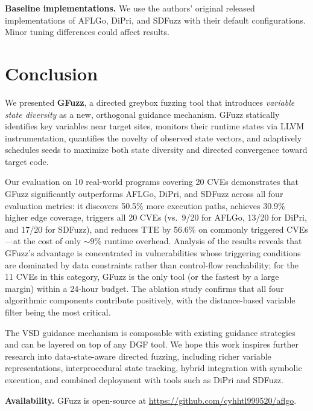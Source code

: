 \documentclass[preprint,12pt,3p]{elsarticle}
\begin{document}
\textbf{Baseline implementations.}  We use the authors' original released
implementations of AFLGo, DiPri, and SDFuzz with their default
configurations.  Minor tuning differences could affect results.

\section{Conclusion}
\label{sec:conclusion}

We presented \textbf{GFuzz}, a directed greybox fuzzing tool that introduces
\emph{variable state diversity} as a new, orthogonal guidance mechanism.
GFuzz statically identifies key variables near target sites, monitors their
runtime states via LLVM instrumentation, quantifies the novelty of observed
state vectors, and adaptively schedules seeds to maximize both state diversity
and directed convergence toward target code.

Our evaluation on 10 real-world programs covering 20 CVEs demonstrates that
GFuzz significantly outperforms AFLGo, DiPri, and SDFuzz across all four
evaluation metrics: it discovers 50.5\% more execution paths, achieves
30.9\% higher edge coverage, triggers all 20 CVEs (vs.\ 9/20 for AFLGo,
13/20 for DiPri, and 17/20 for SDFuzz), and reduces TTE by 56.6\% on
commonly triggered CVEs---at the cost of only $\sim$9\% runtime overhead.
Analysis of the results reveals that GFuzz's advantage is concentrated in
vulnerabilities whose triggering conditions are dominated by data constraints
rather than control-flow reachability; for the 11 CVEs in this category,
GFuzz is the only tool (or the fastest by a large margin) within a 24-hour
budget.  The ablation study confirms that all four algorithmic components
contribute positively, with the distance-based variable filter being the most
critical.

The VSD guidance mechanism is composable with existing guidance strategies
and can be layered on top of any DGF tool.  We hope this work inspires
further research into data-state-aware directed fuzzing, including richer
variable representations, interprocedural state tracking, hybrid integration
with symbolic execution, and combined deployment with tools such as DiPri and
SDFuzz.

\textbf{Availability.}
GFuzz is open-source at \url{https://github.com/cyhhtl999520/aflgo}.

\end{document}
